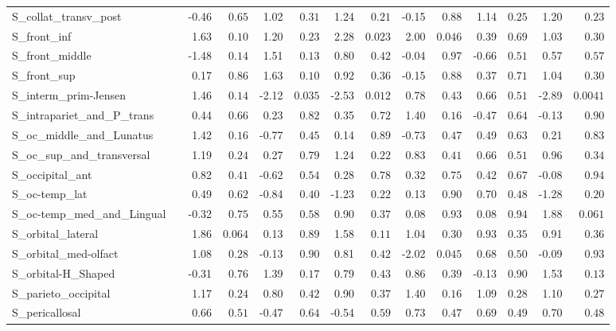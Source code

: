 {\begin{longtable}{llrrrrrrrrrrrr}
S\_collat\_transv\_post &  & -0.46 & $0.65$ & 1.02 & $0.31$ & 1.24 & $0.21$ & -0.15 & $0.88$ & 1.14 & $0.25$ & 1.20 & $0.23$ \\
S\_front\_inf &  & 1.63 & $0.10$ & 1.20 & $0.23$ & 2.28 & $0.023$ & 2.00 & $0.046$ & 0.39 & $0.69$ & 1.03 & $0.30$ \\
S\_front\_middle &  & -1.48 & $0.14$ & 1.51 & $0.13$ & 0.80 & $0.42$ & -0.04 & $0.97$ & -0.66 & $0.51$ & 0.57 & $0.57$ \\
S\_front\_sup &  & 0.17 & $0.86$ & 1.63 & $0.10$ & 0.92 & $0.36$ & -0.15 & $0.88$ & 0.37 & $0.71$ & 1.04 & $0.30$ \\
S\_interm\_prim-Jensen &  & 1.46 & $0.14$ & -2.12 & $0.035$ & -2.53 & $0.012$ & 0.78 & $0.43$ & 0.66 & $0.51$ & -2.89 & $0.0041$ \\
S\_intrapariet\_and\_P\_trans &  & 0.44 & $0.66$ & 0.23 & $0.82$ & 0.35 & $0.72$ & 1.40 & $0.16$ & -0.47 & $0.64$ & -0.13 & $0.90$ \\
S\_oc\_middle\_and\_Lunatus &  & 1.42 & $0.16$ & -0.77 & $0.45$ & 0.14 & $0.89$ & -0.73 & $0.47$ & 0.49 & $0.63$ & 0.21 & $0.83$ \\
S\_oc\_sup\_and\_transversal &  & 1.19 & $0.24$ & 0.27 & $0.79$ & 1.24 & $0.22$ & 0.83 & $0.41$ & 0.66 & $0.51$ & 0.96 & $0.34$ \\
S\_occipital\_ant &  & 0.82 & $0.41$ & -0.62 & $0.54$ & 0.28 & $0.78$ & 0.32 & $0.75$ & 0.42 & $0.67$ & -0.08 & $0.94$ \\
S\_oc-temp\_lat &  & 0.49 & $0.62$ & -0.84 & $0.40$ & -1.23 & $0.22$ & 0.13 & $0.90$ & 0.70 & $0.48$ & -1.28 & $0.20$ \\
S\_oc-temp\_med\_and\_Lingual &  & -0.32 & $0.75$ & 0.55 & $0.58$ & 0.90 & $0.37$ & 0.08 & $0.93$ & 0.08 & $0.94$ & 1.88 & $0.061$ \\
S\_orbital\_lateral &  & 1.86 & $0.064$ & 0.13 & $0.89$ & 1.58 & $0.11$ & 1.04 & $0.30$ & 0.93 & $0.35$ & 0.91 & $0.36$ \\
S\_orbital\_med-olfact &  & 1.08 & $0.28$ & -0.13 & $0.90$ & 0.81 & $0.42$ & -2.02 & $0.045$ & 0.68 & $0.50$ & -0.09 & $0.93$ \\
S\_orbital-H\_Shaped &  & -0.31 & $0.76$ & 1.39 & $0.17$ & 0.79 & $0.43$ & 0.86 & $0.39$ & -0.13 & $0.90$ & 1.53 & $0.13$ \\
S\_parieto\_occipital &  & 1.17 & $0.24$ & 0.80 & $0.42$ & 0.90 & $0.37$ & 1.40 & $0.16$ & 1.09 & $0.28$ & 1.10 & $0.27$ \\
S\_pericallosal &  & 0.66 & $0.51$ & -0.47 & $0.64$ & -0.54 & $0.59$ & 0.73 & $0.47$ & 0.69 & $0.49$ & 0.70 & $0.48$ \\

\end{longtable}}
